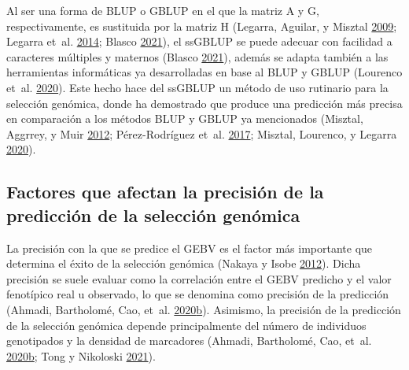 \documentclass[11pt,spanish,a4paper,oneside,]{book} %
\begin{document}
Al ser una forma de BLUP o GBLUP en el que la matriz A y G, respectivamente, es sustituida por la matriz H (Legarra, Aguilar, y Misztal \protect\hyperlink{ref-cite:17}{2009}; Legarra et~al. \protect\hyperlink{ref-cite:15}{2014}; Blasco \protect\hyperlink{ref-cite:21}{2021}), el ssGBLUP se puede adecuar con facilidad a caracteres múltiples y maternos (Blasco \protect\hyperlink{ref-cite:21}{2021}), además se adapta también a las herramientas informáticas ya desarrolladas en base al BLUP y GBLUP (Lourenco et~al. \protect\hyperlink{ref-cite:22}{2020}). Este hecho hace del ssGBLUP un método de uso rutinario para la selección genómica, donde ha demostrado que produce una predicción más precisa en comparación a los métodos BLUP y GBLUP ya mencionados (Misztal, Aggrrey, y Muir \protect\hyperlink{ref-cite:14}{2012}; Pérez-Rodríguez et~al. \protect\hyperlink{ref-cite:19}{2017}; Misztal, Lourenco, y Legarra \protect\hyperlink{ref-cite:18}{2020}).

\hypertarget{factores-que-afectan-la-precisiuxf3n-de-la-predicciuxf3n-de-la-selecciuxf3n-genuxf3mica}{%
\subsection{Factores que afectan la precisión de la predicción de la selección genómica}\label{factores-que-afectan-la-precisiuxf3n-de-la-predicciuxf3n-de-la-selecciuxf3n-genuxf3mica}}

La precisión con la que se predice el GEBV es el factor más importante que determina el éxito de la selección genómica (Nakaya y Isobe \protect\hyperlink{ref-cite:6}{2012}). Dicha precisión se suele evaluar como la correlación entre el GEBV predicho y el valor fenotípico real u observado, lo que se denomina como precisión de la predicción (Ahmadi, Bartholomé, Cao, et~al. \protect\hyperlink{ref-cite:45}{2020}\protect\hyperlink{ref-cite:45}{b}). Asimismo, la precisión de la predicción de la selección genómica depende principalmente del número de individuos genotipados y la densidad de marcadores (Ahmadi, Bartholomé, Cao, et~al. \protect\hyperlink{ref-cite:45}{2020}\protect\hyperlink{ref-cite:45}{b}; Tong y Nikoloski \protect\hyperlink{ref-cite:7}{2021}).
\end{document}
